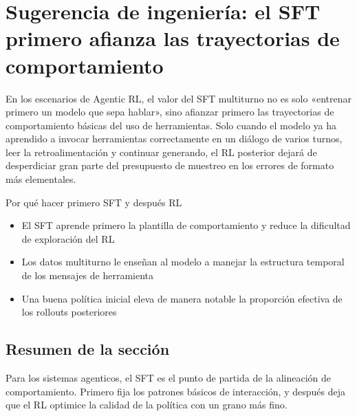 \section{Sugerencia de ingeniería: el SFT primero afianza las trayectorias de comportamiento}
En los escenarios de Agentic RL, el valor del SFT multiturno no es solo «entrenar primero un modelo que sepa hablar», sino afianzar primero las trayectorias de comportamiento básicas del uso de herramientas. Solo cuando el modelo ya ha aprendido a invocar herramientas correctamente en un diálogo de varios turnos, leer la retroalimentación y continuar generando, el RL posterior dejará de desperdiciar gran parte del presupuesto de muestreo en los errores de formato más elementales.

\begin{knowledgebox}{Por qué hacer primero SFT y después RL}
\begin{itemize}
  \item El SFT aprende primero la plantilla de comportamiento y reduce la dificultad de exploración del RL
  \item Los datos multiturno le enseñan al modelo a manejar la estructura temporal de los mensajes de herramienta
  \item Una buena política inicial eleva de manera notable la proporción efectiva de los rollouts posteriores
\end{itemize}
\end{knowledgebox}

\subsection{Resumen de la sección}
Para los sistemas agenticos, el SFT es el punto de partida de la alineación de comportamiento. Primero fija los patrones básicos de interacción, y después deja que el RL optimice la calidad de la política con un grano más fino.

\newpage
